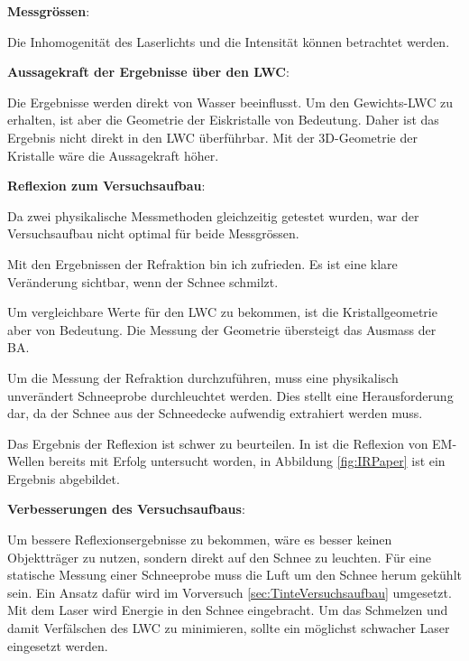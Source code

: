 \textbf{Messgrössen}:

Die Inhomogenität des Laserlichts und die Intensität können betrachtet werden. 



\textbf{Aussagekraft der Ergebnisse über den LWC}:

Die Ergebnisse werden direkt von Wasser beeinflusst. Um den Gewichts-LWC zu erhalten, ist aber die Geometrie der Eiskristalle von Bedeutung. Daher ist das Ergebnis nicht direkt in den LWC überführbar. Mit der 3D-Geometrie der Kristalle wäre die Aussagekraft höher.

\textbf{Reflexion zum Versuchsaufbau}:

Da zwei physikalische Messmethoden gleichzeitig getestet wurden, war der Versuchsaufbau nicht optimal für beide Messgrössen.

Mit den Ergebnissen der Refraktion bin ich zufrieden. Es ist eine klare Veränderung sichtbar, wenn der Schnee schmilzt.

Um vergleichbare Werte für den LWC zu bekommen, ist die Kristallgeometrie aber von Bedeutung. Die Messung der Geometrie übersteigt das Ausmass der BA.

Um die Messung der Refraktion durchzuführen, muss eine physikalisch unverändert Schneeprobe durchleuchtet werden. Dies stellt eine  Herausforderung dar, da der Schnee  aus der Schneedecke aufwendig extrahiert werden muss.

Das Ergebnis der Reflexion ist schwer zu beurteilen. In \cite{Donahue.2022} ist die Reflexion von EM-Wellen bereits mit Erfolg untersucht worden, in Abbildung \ref{fig:IRPaper} ist ein Ergebnis abgebildet.



\textbf{Verbesserungen des Versuchsaufbaus}:

Um bessere Reflexionsergebnisse zu bekommen, wäre es besser keinen Objektträger zu nutzen, sondern direkt auf den Schnee zu leuchten. Für eine statische Messung einer Schneeprobe muss die Luft um den Schnee herum gekühlt sein. Ein Ansatz dafür wird im Vorversuch \ref{sec:TinteVersuchsaufbau} umgesetzt. Mit dem Laser wird Energie in den Schnee eingebracht. Um das Schmelzen und damit Verfälschen des LWC zu minimieren, sollte ein möglichst schwacher Laser eingesetzt werden.


